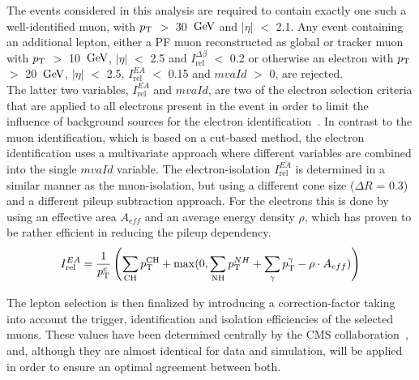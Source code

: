 The events considered in this analysis are required to contain exactly one such a well-identified muon, with $p_{\rm T}$ $>$ 30 $\, \mathrm{GeV}$ and $\vert \eta \vert$ $<$ 2.1. Any event containing an additional lepton, either a PF muon reconstructed as global or tracker muon with $p_{\rm T}$ $>$ 10 $\, \mathrm{GeV}$, $\vert \eta \vert$ $<$ 2.5 and $I_{\textrm{rel}}^{\Delta \beta}$ $<$ 0.2 or otherwise an electron with $p_{\rm T}$ $>$ 20 $\, \mathrm{GeV}$, $\vert \eta \vert$ $<$ 2.5, $I_{\textrm{rel}}^{EA}$ $<$ 0.15 and $mvaId$ $>$ 0, are rejected. 
\\
The latter two variables, $I_{\textrm{rel}}^{EA}$ and $mvaId$, are two of the electron selection criteria that are applied to all electrons present in the event in order to limit the influence of background sources for the electron identification~\cite{ElId8TeV}. In contrast to the muon identification, which is based on a cut-based method, the electron identification uses a multivariate approach where different variables are combined into the single $mvaId$ variable.
The electron-isolation $I_{\textrm{rel}}^{EA}$ is determined in a similar manner as the muon-isolation, but using a different cone size ($\Delta R$ = 0.3) and a different pileup subtraction approach. For the electrons this is done by using an effective area $A_{eff}$ and an average energy density $\rho$, which has proven to be rather efficient in reducing the pileup dependency.%
\begin{equation}\label{eq::DeltaBetaIso}
 I_{\textrm{rel}}^{EA} = \frac{1}{p_{\rm T}^{e}} \left( \sum_{\textrm{CH}} p_{\rm T}^{\textrm{CH}} + \max(0, \sum_{\textrm{NH}} p_{\rm T}^{NH} + \sum_{\gamma} p_{\rm T}^{\gamma} - \rho \cdot A_{eff}) \right)
\end{equation}

The lepton selection is then finalized by introducing a correction-factor taking into account the trigger, identification and isolation efficiencies of the selected muons.
These values have been determined centrally by the CMS collaboration~\cite{MuonPerf8TeV}, and, although they are almost identical for data and simulation, will be applied in order to ensure an optimal agreement between both.

